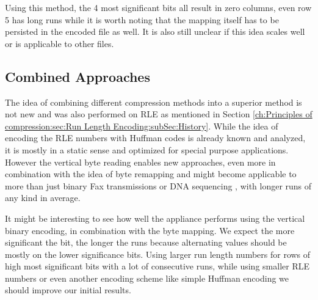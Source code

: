 \par{
\arraydump\dataC

Using this method, the 4 most significant bits all result in zero columns, even row 5 has long runs while it is worth noting that the mapping itself has to be persisted in the encoded file as well. It is also still unclear if this idea scales well or is applicable to other files.
}

\subsection{Combined Approaches}
\par{
The idea of combining different compression methods into a superior method is not new and was also performed on RLE as mentioned in Section \ref{ch:Principles of compression:sec:Run Length Encoding:subSec:History}. While the idea of encoding the RLE numbers with Huffman codes is already known and analyzed, it is mostly in a static sense and optimized for special purpose applications. However the vertical byte reading enables new approaches, even more in combination with the idea of byte remapping and might become applicable to more than just binary Fax transmissions or DNA sequencing \cite{rle-bio}\cite{rle-dna}, with longer runs of any kind in average.
}
\par{
It might be interesting to see how well the appliance performs using the vertical binary encoding, in combination with the byte mapping. We expect the more significant the bit, the longer the runs because alternating values should be mostly on the lower significance bits. Using larger run length numbers for rows of high most significant bits with a lot of consecutive runs, while using smaller RLE numbers or even another encoding scheme like simple Huffman encoding we should improve our initial results.
}

